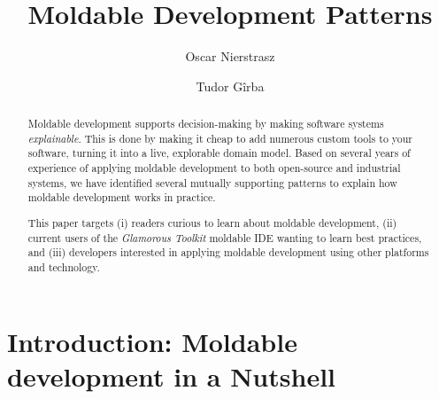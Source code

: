 \documentclass[acmsmall,screen,authorversion,nonacm]{acmart} %
\newcommand\cp[1]{\nbe{Cesare}{#1}{olive}} %
\newcommand\dd[1]{\nbe{Daniel}{#1}{magenta}} %
\begin{document}
\title[Moldable Development Patterns --- REVIEW DRAFT]{Moldable Development Patterns}

\author{Oscar Nierstrasz}

\author{Tudor G\^irba}

\renewcommand{\shortauthors}{Nierstrasz and G\^irba} %

\begin{abstract}

Moldable development supports decision-making by making software systems \emph{explainable}.
This is done by making it cheap to add numerous custom tools to your software, 
turning it into a live, explorable domain model.
Based on several years of experience of applying moldable development to both open-source and industrial systems, we have identified several mutually supporting patterns to explain how moldable development works in practice.

This paper targets
(i) readers curious to learn about moldable development,
(ii) current users of the \emph{Glamorous Toolkit} moldable IDE
wanting to learn best practices, and
(iii) developers interested in applying moldable development using other platforms and technology.
\end{abstract}


\maketitle

\section{Introduction: Moldable development in a Nutshell}
\end{document}
